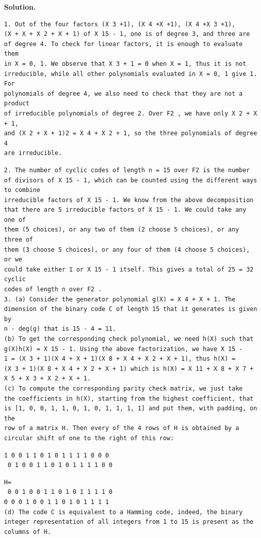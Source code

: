 \documentclass[11pt]{article}
\begin{document}
\begin{solutionbox}
\textbf{Solution.}

\begin{Verbatim}[fontsize=\small]
1. Out of the four factors (X 3 +1), (X 4 +X +1), (X 4 +X 3 +1),
(X + X + X 2 + X + 1) of X 15 - 1, one is of degree 3, and three are
of degree 4. To check for linear factors, it is enough to evaluate them
in X = 0, 1. We observe that X 3 + 1 = 0 when X = 1, thus it is not
irreducible, while all other polynomials evaluated in X = 0, 1 give 1. For
polynomials of degree 4, we also need to check that they are not a product
of irreducible polynomials of degree 2. Over F2 , we have only X 2 + X + 1,
and (X 2 + X + 1)2 = X 4 + X 2 + 1, so the three polynomials of degree 4
are irreducible.
\end{Verbatim}
\begin{Verbatim}[fontsize=\small]
2. The number of cyclic codes of length n = 15 over F2 is the number of divisors of X 15 - 1, which can be counted using the different ways to combine
irreducible factors of X 15 - 1. We know from the above decomposition
that there are 5 irreducible factors of X 15 - 1. We could take any one of
them (5 choices), or any two of them (2 choose 5 choices), or any three of
them (3 choose 5 choices), or any four of them (4 choose 5 choices), or we
could take either 1 or X 15 - 1 itself. This gives a total of 25 = 32 cyclic
codes of length n over F2 .
3. (a) Consider the generator polynomial g(X) = X 4 + X + 1. The dimension of the binary code C of length 15 that it generates is given by
n - deg(g) that is 15 - 4 = 11.
(b) To get the corresponding check polynomial, we need h(X) such that
g(X)h(X) = X 15 - 1. Using the above factorization, we have X 15 -
1 = (X 3 + 1)(X 4 + X + 1)(X 8 + X 4 + X 2 + X + 1), thus h(X) =
(X 3 + 1)(X 8 + X 4 + X 2 + X + 1) which is h(X) = X 11 + X 8 + X 7 +
X 5 + X 3 + X 2 + X + 1.
(c) To compute the corresponding parity check matrix, we just take
the coefficients in h(X), starting from the highest coefficient, that
is [1, 0, 0, 1, 1, 0, 1, 0, 1, 1, 1, 1] and put them, with padding, on the
row of a matrix H. Then every of the 4 rows of H is obtained by a
circular shift of one to the right of this row:
\end{Verbatim}
\begin{Verbatim}[fontsize=\small]
1 0 0 1 1 0 1 0 1 1 1 1 0 0 0
 0 1 0 0 1 1 0 1 0 1 1 1 1 0 0
\end{Verbatim}
\begin{Verbatim}[fontsize=\small]
H=
 0 0 1 0 0 1 1 0 1 0 1 1 1 1 0
0 0 0 1 0 0 1 1 0 1 0 1 1 1 1
(d) The code C is equivalent to a Hamming code, indeed, the binary
integer representation of all integers from 1 to 15 is present as the
columns of H.
\end{Verbatim}
\end{solutionbox}
\end{document}
